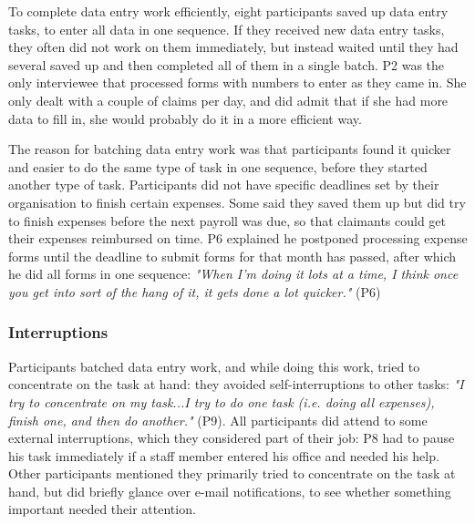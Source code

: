 To complete data entry work efficiently, eight participants saved up data entry tasks, to enter all data in one sequence. If they received new data entry tasks, they often did not work on them immediately, but instead waited until they had several saved up and then completed all of them in a single batch. P2 was the only interviewee that processed forms with numbers to enter as they came in. She only dealt with a couple of claims per day, and did admit that if she had more data to fill in, she would probably do it in a more efficient way.

The reason for batching data entry work was that participants found it quicker and easier to do the same type of task in one sequence, before they started another type of task. Participants did not have specific deadlines set by their organisation to finish certain expenses. Some said they saved them up but did try to finish expenses before the next payroll was due, so that claimants could get their expenses reimbursed on time. P6 explained he postponed processing expense forms until the deadline to submit forms for that month has passed, after which he did all forms in one sequence: \textit{"When I’m doing it lots at a time, I think once you get into sort of the hang of it, it gets done a lot quicker."} (P6)

\subsubsection{Interruptions}
Participants batched data entry work, and while doing this work, tried to concentrate on the task at hand: they avoided self-interruptions to other tasks: \textit{"I try to concentrate on my task...I try to do one task (i.e. doing all expenses), finish one, and then do another."} (P9). All participants did attend to some external interruptions, which they considered part of their job: P8 had to pause his task immediately if a staff member entered his office and needed his help. Other participants mentioned they primarily tried to concentrate on the task at hand, but did briefly glance over e-mail notifications, to see whether something important needed their attention.

